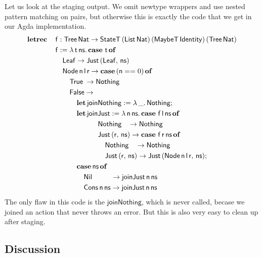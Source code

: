 \documentclass[acmsmall,screen,review,anonymous]{acmart}
\newcommand{\msf}[1]{{\mathsf{#1}}}
\newcommand{\mbf}[1]{{\mathbf{#1}}}
\newcommand{\ind}{\hspace{1em}}
\newcommand{\lam}{\lambda\,}
\newcommand{\letrec}{\mbf{letrec}\,}
\newcommand{\of}{\mbf{of}\,}
\newcommand{\letdef}{\mbf{let\,}}
\newcommand{\vn}{\mathsf{n}}
\newcommand{\vf}{\mathsf{f}}
\newcommand{\vt}{\mathsf{t}}
\newcommand{\vr}{\mathsf{r}}
\newcommand{\vl}{\mathsf{l}}
\newcommand{\vns}{\mathsf{ns}}
\newcommand{\List}{\msf{List}}
\newcommand{\Tree}{\msf{Tree}}
\newcommand{\Node}{\msf{Node}}
\newcommand{\Leaf}{\msf{Leaf}}
\newcommand{\Nil}{\msf{Nil}}
\newcommand{\Cons}{\msf{Cons}}
\newcommand{\case}{\mbf{case\,}}
\newcommand{\True}{\msf{True}}
\newcommand{\False}{\msf{False}}
\newcommand{\Nat}{\msf{Nat}}
\newcommand{\MaybeT}{\msf{MaybeT}}
\newcommand{\Nothing}{\msf{Nothing}}
\newcommand{\Just}{\msf{Just}}
\theoremstyle{remark}
\newcommand{\StateT}{\msf{StateT}}
\newcommand{\Identity}{\msf{Identity}}
\begin{document}
Let us look at the staging output. We omit newtype wrappers and use nested
pattern matching on pairs, but otherwise this is exactly the code that we get in
our Agda implementation.
\begin{alignat*}{4}
  &  \letrec &&\vf : \Tree\,\Nat \to \StateT\,(\List\,\Nat)\,(\MaybeT\,\Identity)\,(\Tree\,\Nat) \\
  &          &&\vf := \lam \vt\,\vns.\, \case\,\vt\,\of\\
  &          &&\ind \Leaf \to \Just\,(\Leaf,\,\vns) \\
  &          &&\ind \Node\,\vn\,\vl\,\vr \to \case (\vn == 0)\,\of\\
  &          &&\ind \ind \True \hspace{0.25em}\to \Nothing \\
  &          &&\ind \ind \False \to \\
  &          &&\ind \ind \ind \letdef \msf{joinNothing} := \lam \_.\,\Nothing;\\
  &          &&\ind \ind \ind \letdef \msf{joinJust} := \lam \vn\,\vns.\,\case\,\vf\,\vl\,\vns\,\of\\
  &          &&\ind \ind \ind \ind \ind \ind \Nothing\hspace{0.9em} \to \Nothing\\
  &          &&\ind \ind \ind \ind \ind \ind \Just\,(\vr,\,\vns) \to \case\,\vf\,\vr\,\vns\,\of\\
  &          &&\ind \ind \ind \ind \ind \ind \ind \Nothing\hspace{.95em} \to \Nothing\\
  &          &&\ind \ind \ind \ind \ind \ind \ind \Just\,(\vr,\,\vns) \to \Just\,(\Node\,\vn\,\vl\,\vr,\,\vns);\\
  &          &&\ind \ind \ind \case \vns\,\of\\
  &          &&\ind \ind \ind \ind \Nil \hspace{2.65em}\to \msf{joinJust}\,\vn\,\vns\\
  &          &&\ind \ind \ind \ind \Cons\,\vn\,\vns \to \msf{joinJust}\,\vn\,\vns
\end{alignat*}
The only flaw in this code is the $\msf{joinNothing}$, which is never called,
becase we joined an action that never throws an error. But this is also
very easy to clean up after staging.
\subsection{Discussion}
\end{document}
